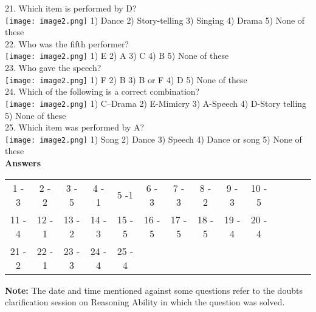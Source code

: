 \documentclass[
]{article}
\begin{document}
21. Which item is performed by D?\\
\texttt{[image: image2.png]}
1) Dance \hspace{2mm}2) Story-telling \hspace{2mm}3) Singing \hspace{2mm}4) Drama \hspace{2mm}5) None of these\\

22. Who was the fifth performer?\\
\texttt{[image: image2.png]}
1) E \hspace{2mm}2) A \hspace{2mm}3) C \hspace{2mm}4) B \hspace{2mm}5) None of these\\

23. Who gave the speech?\\
\texttt{[image: image2.png]}
1) F \hspace{2mm}2) B \hspace{2mm}3) B or F \hspace{2mm}4) D \hspace{2mm}5) None of these\\

24. Which of the following is a correct combination?\\
\texttt{[image: image2.png]}
1) C–Drama \hspace{2mm}2) E-Mimicry \hspace{2mm}3) A-Speech
\hspace{2mm}4) D-Story telling \hspace{2mm}5) None of these\\

25. Which item was performed by A?\\
\texttt{[image: image2.png]}
1) Song \hspace{2mm}2) Dance \hspace{2mm}3) Speech
\hspace{2mm}4) Dance or song \hspace{2mm}5) None of these\\

\textbf{Answers}
\begin{tabular}{c c c c c c c c c c c c c c}
1 - 3& 2 - 2& 3 - 5& 4 - 1& 5 -1& 6 - 3& 7 - 3& 8 - 2& 9 - 3& 10 - 5\\
11 - 4& 12 - 1& 13 - 2 &14 - 3& 15 - 5& 16 - 5& 17 - 5& 18 - 5& 19 - 4 &20 - 4\\
21 - 2& 22 - 1& 23 - 3& 24 - 4& 25 - 4\\
\end{tabular}


\textbf{Note:} The date and time mentioned against some questions refer to the doubts clarification
session on Reasoning Ability in which the question was solved.
\end{document}
